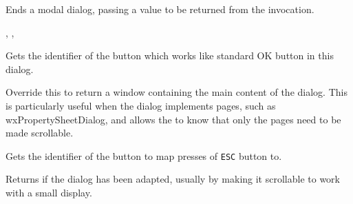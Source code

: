 \label{wxdialogendmodal}


Ends a modal dialog, passing a value to be returned from the \rtfsp
invocation.




,\rtfsp
{},\rtfsp
{}


\label{wxdialoggetaffirmativeid}


Gets the identifier of the button which works like standard OK button in this
dialog.



\label{wxdialoggetcontentwindow}


Override this to return a window containing the main content of the dialog. This is
particularly useful when the dialog implements pages, such as wxPropertySheetDialog,
and allows the  to know that only the pages need to be made scrollable.

\label{wxdialoggetescapeid}


Gets the identifier of the button to map presses of \texttt{\textsc{ESC}}
button to.




\label{wxdialoggetlayoutadaptationdone}


Returns \true if the dialog has been adapted, usually by making it scrollable to work with a small display.

